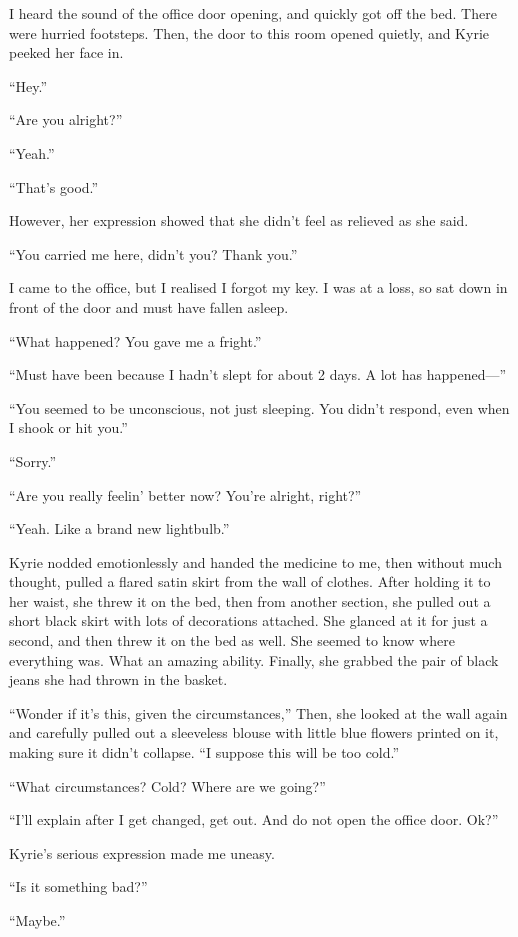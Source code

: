 \documentclass[oneside]{book}
\begin{document}
I heard the sound of the office door opening, and quickly got off the bed. There were hurried footsteps. Then, the door to this room opened quietly, and Kyrie peeked her face in.

“Hey.”

“Are you alright?”

“Yeah.”

“That’s good.”

However, her expression showed that she didn’t feel as relieved as she said.

“You carried me here, didn’t you? Thank you.”

I came to the office, but I realised I forgot my key. I was at a loss, so sat down in front of the door and must have fallen asleep.

“What happened? You gave me a fright.”

“Must have been because I hadn’t slept for about 2 days. A lot has happened—”

“You seemed to be unconscious, not just sleeping. You didn’t respond, even when I shook or hit you.”

“Sorry.”

“Are you really feelin’ better now? You’re alright, right?”

“Yeah. Like a brand new lightbulb.”

Kyrie nodded emotionlessly and handed the medicine to me, then without much thought, pulled a flared satin skirt from the wall of clothes. After holding it to her waist, she threw it on the bed, then from another section, she pulled out a short black skirt with lots of decorations attached. She glanced at it for just a second, and then threw it on the bed as well. She seemed to know where everything was. What an amazing ability. Finally, she grabbed the pair of black jeans she had thrown in the basket.

“Wonder if it’s this, given the circumstances,” Then, she looked at the wall again and carefully pulled out a sleeveless blouse with little blue flowers printed on it, making sure it didn’t collapse. “I suppose this will be too cold.”

“What circumstances? Cold? Where are we going?”

“I’ll explain after I get changed, get out. And do not open the office door. Ok?”

Kyrie’s serious expression made me uneasy.

“Is it something bad?”

“Maybe.”
\end{document}
